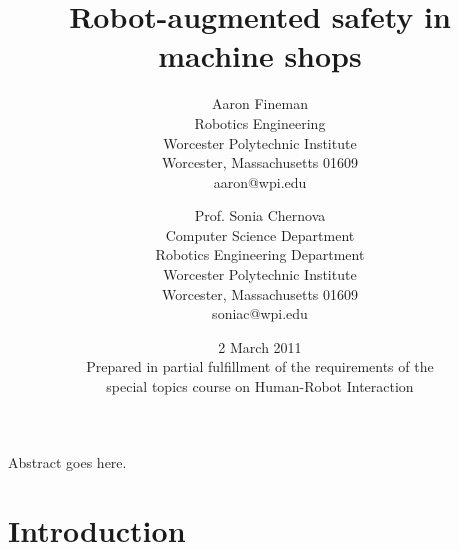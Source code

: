 \documentclass[12pt]{article}
\title{Robot-augmented safety in machine shops\\}
\author{
	Aaron Fineman\\
	\small{Robotics Engineering}\\
	\small{Worcester Polytechnic Institute}\\
	\small{Worcester, Massachusetts 01609}\\
	\small{aaron@wpi.edu}
	\and
	Prof. Sonia Chernova\\
	\small{Computer Science Department}\\
	\small{Robotics Engineering Department}\\
	\small{Worcester Polytechnic Institute}\\
	\small{Worcester, Massachusetts 01609}\\
	\small{soniac@wpi.edu}
}
\date{2 March 2011\\\small{Prepared in partial fulfillment of the requirements of the\\ special topics course on Human-Robot Interaction}}
\begin{document}
\maketitle
\newpage

\abstract
Abstract goes here.\cite{BNL:safety}

\section{Introduction}




\end{document}
